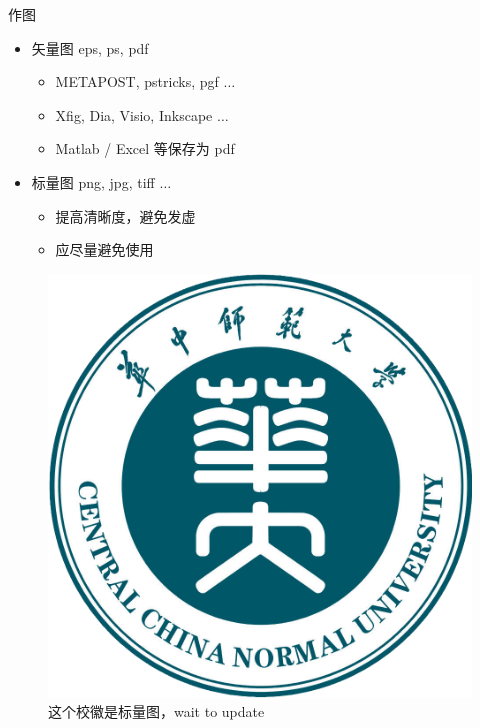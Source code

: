 \begin{frame}{作图}
	\begin{itemize}
		\item 矢量图 eps, ps, pdf
		      \begin{itemize}
			      \item METAPOST, pstricks, pgf $\ldots$
			      \item Xfig, Dia, Visio, Inkscape $\ldots$
			      \item Matlab / Excel 等保存为 pdf
		      \end{itemize}
		\item 标量图 png, jpg, tiff $\ldots$
		      \begin{itemize}
			      \item 提高清晰度，避免发虚
			      \item 应尽量避免使用
		      \end{itemize}
	\end{itemize}
	\begin{figure}[htpb]
		\centering
		\includegraphics[width=0.15\linewidth]{pic/logo/CCNU.jpg}
		\caption{这个校徽是标量图，wait to update}
	\end{figure}
\end{frame}
